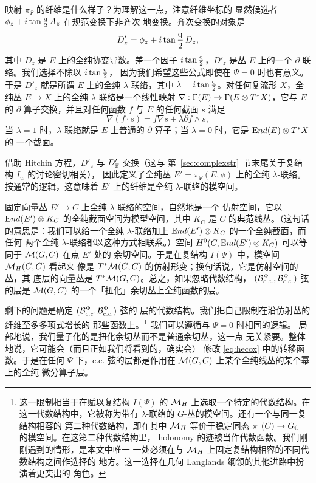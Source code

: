 映射 $\pi_\Psi$ 的纤维是什么样子？为理解这一点，注意纤维坐标的
显然候选者 $\phi_z+i\tan{{\eurm q}\over 2}\, A_z$ 在规范变换下非齐次
地变换。齐次变换的对象是 %
\setcounter{equation}{35}
\begin{equation}\label{eq:gyko}
D'_z=\phi_z+i\tan{{\eurm
q}\over 2}\, D_z,
\end{equation}
 其中 $D_z$ 是 $E$ 上的全纯协变导数。差一个因子
$i\tan{{\eurm q}\over 2}$，$D'_z$ 是丛 $E$ 上的一个
$\partial$-联络。我们选择不除以 $i\tan{{\eurm q}\over 2}$，
因为我们希望这些公式即使在 $\Psi=0$ 时也有意义。于是 $D'_z$
就是所谓 $E$ 上的全纯 $\lambda$-联络，其中
$\lambda=i\tan{{\eurm q}\over 2}$。对任何复流形 $X$，全纯丛
$E\to X$ 上的全纯 $\lambda$-联络是一个线性映射
$\nabla: \Gamma(E)\ra \Gamma(E\ot T^*X)$，它与 $E$ 的
$\bar\partial$ 算子交换，并且对任何函数 $f$ 与 $E$ 的任何截面
$s$ 满足
\setcounter{equation}{36}
\begin{equation}\label{eq:hyfo}
\nabla (f\cdot s)=f\nabla s + \lambda
\partial f\wedge s,
\end{equation}
 当 $\lambda=1$ 时，$\lambda$-联络就是 $E$ 上普通的
$\partial$ 算子；当 $\lambda=0$ 时，它是 $\End(E)\ot T^*X$ 的
一个截面。

借助 Hitchin 方程，$D'_z$ 与 $D'_\bz$ 交换（这与
第~\ref{sec:complexstr}~节末尾关于复结构 $I_w$ 的讨论密切相关），
因此定义了全纯丛 $E'=\pi_\Psi(E,\phi)$ 上的全纯
$\lambda$-联络。按通常的逻辑，这意味着 $E'$ 上的纤维是全纯
$\lambda$-联络的模空间。

固定向量丛 $E'\to C$ 上全纯 $\lambda$-联络的空间，自然地是一个
仿射空间，它以 $\End(E')\ot K_C$ 的全纯截面空间为模型空间，其中
$K_C$ 是 $C$ 的典范线丛。（这句话的意思是：我们可以给一个全纯
$\lambda$-联络加上 $\End(E')\otimes K_C$ 的一个全纯截面，而任何
两个全纯 $\lambda$-联络都以这种方式相联系。）空间
$H^0(C,\End(E')\ot K_C)$ 可以等同于 $\cM(G,C)$ 在点 $E'$ 处的
余切空间。于是在复结构 $I(\Psi)$ 中，模空间 $\MH(G,C)$ 看起来
像是 $T^*\cM(G,C)$ 的仿射形变；换句话说，它是仿射空间的丛，其
底层的向量丛是 $T^*\CM(G,C)$。总之，如果忽略代数结构，
$({\cal B}_{c.c.}^\Psi,{\cal B}_{c.c.}^\Psi)$ 弦的层是
$\cM(G,C)$ 的一个「扭化」余切丛上全纯函数的层。

剩下的问题是确定 $({\cal B}_{c.c}^\Psi,{\cal B}_{c.c.}^\Psi)$ 弦的
层的代数结构。我们把自己限制在沿仿射丛的纤维至多多项式增长的
那些函数上。\footnote{这一限制相当于在赋以复结构 $I(\Psi)$ 的
$\MH$ 上选取一个特定的代数结构。在这一代数结构中，它被称为带有
$\lambda$-联络的 $G$-丛的模空间。还有一个与同一复结构相容的
第二种代数结构，即在其中 $\MH$ 等价于稳定同态
$\pi_1(C)\to G_{\Bbb{C}}$ 的模空间。在这第二种代数结构里，
holonomy 的迹被当作代数函数。我们刚刚遇到的情形，是本文中唯一
一处必须在与 $\MH$ 上固定复结构相容的不同代数结构之间作选择的
地方。这一选择在几何 Langlands 纲领的其他进路中扮演着更突出的
角色。} 我们可以遵循与 $\Psi=0$ 时相同的逻辑。
 局部地说，我们量子化的是扭化余切丛而不是普通余切丛，这一点
无关紧要。整体地说，它可能会（而且正如我们将看到的，确实会）
修改 \eqref{eq:hecox} 中的转移函数。于是在任何 $\Psi$ 下，c.c.
弦的层都是作用在 $\cM(G,C)$ 上某个全纯线丛的某个幂上的全纯
微分算子层。

